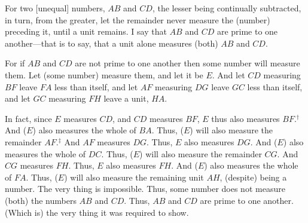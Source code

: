 \begin{Parallel}{}{}
{\epsfysize=1.8in
\centerline{}

For  two [unequal] numbers, $AB$ and $CD$, the lesser being continually
subtracted, in turn, from the greater, let the remainder never measure the (number) preceding it, until a unit remains. I say that $AB$ and
$CD$ are prime to one another---that is to say, that a unit alone measures
(both) $AB$ and $CD$.

For if $AB$ and $CD$ are not prime to one another then some number will measure
 them. Let (some number) measure  them, and let it be $E$. And let $CD$ measuring $BF$ leave $FA$
less than itself, and let $AF$ measuring $DG$ leave $GC$ less than itself, and 
let $GC$ measuring $FH$ leave a unit, $HA$.

In fact, since $E$ measures $CD$, and $CD$ measures $BF$, $E$ thus also measures
$BF$.$^\dag$ 
And ($E$) also measures the whole of $BA$. Thus, ($E$) will also measure the
remainder $AF$.$^\ddag$  And $AF$ measures $DG$. Thus, $E$ also
measures $DG$. And ($E$) also measures the whole of $DC$. Thus, ($E$) will
also measure the remainder $CG$. And $CG$ measures $FH$. Thus, $E$ also measures $FH$. And ($E$) also measures the whole of $FA$. Thus, ($E$) will also measure the remaining unit $AH$, (despite) being a number. The very thing is impossible.
Thus, some number does not measure (both) the numbers $AB$ and $CD$.
Thus, $AB$ and $CD$ are prime to one another. (Which is) the very thing it
was required to show.}
\end{Parallel}


\vspace{7pt}{\footnotesize\noindent$^\dag$ Here, use is made of the unstated common notion that if
$a$ measures $b$, and $b$ measures $c$, then $a$ also measures $c$,
where all symbols denote numbers.\\[0.5ex]
$^\ddag$ Here, use is made of the unstated common notion
that if $a$ measures $b$, and $a$ measures part of $b$, then $a$
also measures the remainder of $b$, where all
symbols denote numbers.}

